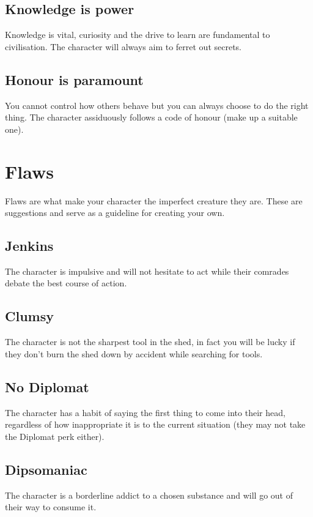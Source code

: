 \documentclass[a4paper,10pt,oneside]{book}
\begin{document}
\subsection{Knowledge is power}
Knowledge is vital, curiosity and the drive to learn are fundamental to civilisation. The character will always aim to ferret out secrets.

\subsection{Honour is paramount}
You cannot control how others behave but you can always choose to do the right thing. The character assiduously follows a code of honour (make up a suitable one).



\section{Flaws}
\label{sec:flaws}
Flaws are what make your character the imperfect creature they are. These are suggestions and serve as a guideline for creating your own.

\subsection{Jenkins}
The character is impulsive and will not hesitate to act while their comrades debate the best course of action.

\subsection{Clumsy}
The character is not the sharpest tool in the shed, in fact you will be lucky if they don't burn the shed down by accident while searching for tools.

\subsection{No Diplomat}
The character has a habit of saying the first thing to come into their head, regardless of how inappropriate it is to the current situation (they may not take the Diplomat perk either).

\subsection{Dipsomaniac}
The character is a borderline addict to a chosen substance and will go out of their way to consume it.
\end{document}
